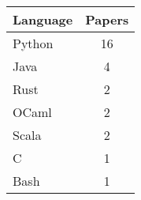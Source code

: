 \begin{tabular}{lc}
\toprule
 Language   &  Papers  \\
\midrule
 Python     &    16    \\
 Java       &    4     \\
 Rust       &    2     \\
 OCaml      &    2     \\
 Scala      &    2     \\
 C          &    1     \\
 Bash       &    1     \\
\bottomrule
\end{tabular}
